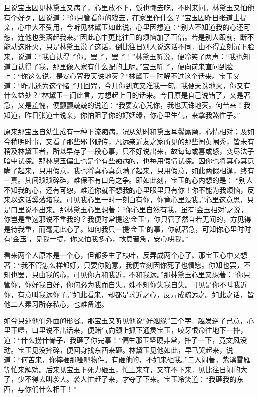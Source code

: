 \begin{parag}
    且说宝玉因见林黛玉又病了，心里放不下，饭也懒去吃，不时来问。林黛玉又怕他有个好歹，因说道：“你只管看你的戏去，在家里作什么？”宝玉因昨日张道士提亲，心中大不受用，今听见林黛玉如此说，心里因想道：“别人不知道我的心还可恕，连他也奚落起我来。”因此心中更比往日的烦恼加了百倍。若是别人跟前，断不能动这肝火，只是林黛玉说了这话，倒比往日别人说这话不同，由不得立刻沉下脸来，说道：“我白认得了你。罢了，罢了！”林黛玉听说，便冷笑了两声：“我也知道白认得了我，那里像人家有什么配的上呢。”宝玉听了，便向前来直问到脸上：“你这么说，是安心咒我天诛地灭？”林黛玉一时解不过这个话来。宝玉又道：“昨儿还为这个赌了几回咒，今儿你到底又准我一句。我便天诛地灭，你又有什么益处？”林黛玉一闻此言，方想起上日的话来。今日原是自己说错了，又是著急，又是羞愧，便颤颤兢兢的说道：“我要安心咒你，我也天诛地灭。何苦来！我知道，昨日张道士说亲，你怕阻了你的好姻缘，你心里生气，来拿我煞性子。”
\end{parag}


\begin{parag}
    原来那宝玉自幼生成有一种下流痴病，况从幼时和黛玉耳鬓厮磨，心情相对；及如今稍明时事，又看了那些邪书僻传，凡远亲近友之家所见的那些闺英闱秀，皆未有稍及林黛玉者，所以早存了一段心事，只不好说出来，故每每或喜或怒，变尽法子暗中试探。那林黛玉偏生也是个有些痴病的，也每用假情试探。因你也将真心真意瞒了起来，只用假意，我也将真心真意瞒了起来，只用假意，如此两假相逢，终有一真。其间琐琐碎碎，难保不有口角之争。即如此刻，宝玉的心内想的是： “别人不知我的心，还有可恕，难道你就不想我的心里眼里只有你！你不能为我烦恼，反来以这话奚落堵我。可见我心里一时一刻白有你，你竟心里没我。”心里这意思，只是口里说不出来。那林黛玉心里想著：“你心里自然有我，虽有‘金玉相对’之说，你岂是重这邪说不重我的？我便时常提这‘金玉’，你只管了然自若无闻的，方见得是待我重，而毫无此心了。如何我只一提‘金玉’的事，你就著急，可知你心里时时有‘金玉’，见我一提，你又怕我多心，故意著急，安心哄我。”
\end{parag}


\begin{parag}
    看来两个人原本是一个心，但都多生了枝叶，反弄成两个心了。那宝玉心中又想著：“我不管怎么样都好，只要你随意，我便立刻因你死了也情愿。你知也罢，不知也罢，只由我的心，可见你方和我近，不和我远。”那林黛玉心里又想著：“你只管你，你好我自好，你何必为我而自失。殊不知你失我自失。可见是你不叫我近你，有意叫我远你了。”如此看来，却都是求近之心，反弄成疏远之。如此之话，皆他二人素习所存私心，也难备述。
\end{parag}


\begin{parag}
    如今只述他们外面的形容。那宝玉又听见他说“好姻缘”三个字，越发逆了己意，心里干噎，口里说不出话来，便赌气向颈上抓下通灵宝玉，咬牙恨命往地下一摔，道：“什么捞什骨子，我砸了你完事！”偏生那玉坚硬非常，摔了一下，竟文风没动。宝玉见没摔碎，便回身找东西来砸。林黛玉见他如此，早已哭起来，说道：“何苦来，你摔砸那哑吧物件。有砸他的，不如来砸我。”二人闹著，紫鹃雪雁等忙来解劝。后来见宝玉下死力砸玉，忙上来夺，又夺不下来，见比往日闹的大了，少不得去叫袭人。袭人忙赶了来，才夺了下来。宝玉冷笑道：“我砸我的东西，与你们什么相干！”
\end{parag}


